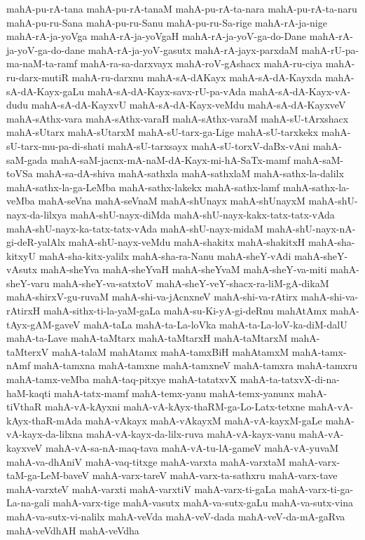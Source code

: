 {mahA-pu-rA-tana
mahA-pu-rA-tanaM
mahA-pu-rA-ta-nara
mahA-pu-rA-ta-naru
mahA-pu-ru-Sana
mahA-pu-ru-Sanu
mahA-pu-ru-Sa-rige
mahA-rA-ja-nige
mahA-rA-ja-yoVga
mahA-rA-ja-yoVgaH
mahA-rA-ja-yoV-ga-do-Dane
mahA-rA-ja-yoV-ga-do-dane
mahA-rA-ja-yoV-gasutx
mahA-rA-jayx-parxdaM
mahA-rU-pa-ma-naM-ta-ramf
mahA-ra-sa-darxvayx
mahA-roV-gAshacx
mahA-ru-ciya
mahA-ru-darx-mutiR
mahA-ru-darxnu
mahA-sA-dAKayx
mahA-sA-dA-Kayxda
mahA-sA-dA-Kayx-gaLu
mahA-sA-dA-Kayx-savx-rU-pa-vAda
mahA-sA-dA-Kayx-vA-dudu
mahA-sA-dA-KayxvU
mahA-sA-dA-Kayx-veMdu
mahA-sA-dA-KayxveV
mahA-sAthx-vara
mahA-sAthx-varaH
mahA-sAthx-varaM
mahA-sU-tArxshacx
mahA-sUtarx
mahA-sUtarxM
mahA-sU-tarx-ga-Lige
mahA-sU-tarxkekx
mahA-sU-tarx-mu-pa-di-shati
mahA-sU-tarxsayx
mahA-sU-torxV-daBx-vAni
mahA-saM-gada
mahA-saM-jacnx-mA-naM-dA-Kayx-mi-hA-SaTx-mamf
mahA-saM-toVSa
mahA-sa-dA-shiva
mahA-sathxla
mahA-sathxlaM
mahA-sathx-la-dalilx
mahA-sathx-la-ga-LeMba
mahA-sathx-lakekx
mahA-sathx-lamf
mahA-sathx-la-veMba
mahA-seVna
mahA-seVnaM
mahA-shUnayx
mahA-shUnayxM
mahA-shU-nayx-da-lilxya
mahA-shU-nayx-diMda
mahA-shU-nayx-kakx-tatx-tatx-vAda
mahA-shU-nayx-ka-tatx-tatx-vAda
mahA-shU-nayx-midaM
mahA-shU-nayx-nA-gi-deR-yalAlx
mahA-shU-nayx-veMdu
mahA-shakitx
mahA-shakitxH
mahA-sha-kitxyU
mahA-sha-kitx-yalilx
mahA-sha-ra-Nanu
mahA-sheY-vAdi
mahA-sheY-vAsutx
mahA-sheYva
mahA-sheYvaH
mahA-sheYvaM
mahA-sheY-va-miti
mahA-sheY-varu
mahA-sheY-va-satxtoV
mahA-sheY-veY-shacx-ra-liM-gA-dikaM
mahA-shirxV-gu-ruvaM
mahA-shi-va-jAcnxneV
mahA-shi-va-rAtirx
mahA-shi-va-rAtirxH
mahA-sithx-ti-la-yaM-gaLa
mahA-su-Ki-yA-gi-deRnu
mahAtAmx
mahA-tAyx-gAM-gaveV
mahA-taLa
mahA-ta-La-loVka
mahA-ta-La-loV-ka-diM-dalU
mahA-ta-Lave
mahA-taMtarx
mahA-taMtarxH
mahA-taMtarxM
mahA-taMterxV
mahA-talaM
mahAtamx
mahA-tamxBiH
mahAtamxM
mahA-tamx-nAmf
mahA-tamxna
mahA-tamxne
mahA-tamxneV
mahA-tamxra
mahA-tamxru
mahA-tamx-veMba
mahA-taq-pitxye
mahA-tatatxvX
mahA-ta-tatxvX-di-na-haM-kaqti
mahA-tatx-mamf
mahA-temx-yanu
mahA-temx-yanunx
mahA-tiVthaR
mahA-vA-kAyxni
mahA-vA-kAyx-thaRM-ga-Lo-Latx-tetxne
mahA-vA-kAyx-thaR-mAda
mahA-vAkayx
mahA-vAkayxM
mahA-vA-kayxM-gaLe
mahA-vA-kayx-da-lilxna
mahA-vA-kayx-da-lilx-ruva
mahA-vA-kayx-vanu
mahA-vA-kayxveV
mahA-vA-sa-nA-maq-tava
mahA-vA-tu-lA-gameV
mahA-vA-yuvaM
mahA-va-dhAniV
mahA-vaq-titxge
mahA-varxta
mahA-varxtaM
mahA-varx-taM-ga-LeM-baveV
mahA-varx-tareV
mahA-varx-ta-sathxru
mahA-varx-tave
mahA-varxteV
mahA-varxti
mahA-varxtiV
mahA-varx-ti-gaLa
mahA-varx-ti-ga-La-na-gali
mahA-varx-tige
mahA-vasutx
mahA-va-sutx-gaLu
mahA-va-sutx-vina
mahA-va-sutx-vi-nalilx
mahA-veVda
mahA-veV-dada
mahA-veV-da-mA-gaRva
mahA-veVdhAH
mahA-veVdha
}
